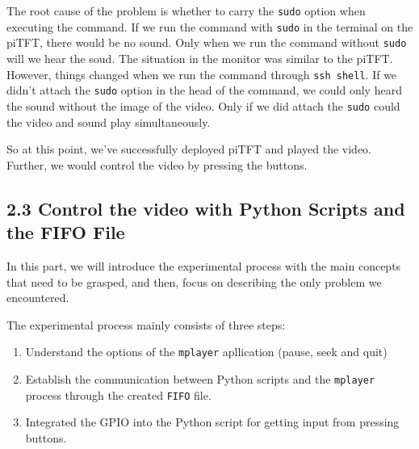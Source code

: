 \documentclass[12pt]{report}
\newcommand{\code}[1]{\colorbox{light-gray}{\texttt{#1}}}
\begin{document}
The root cause of the problem is whether to carry the \code{sudo} option when executing the command. If we run the command with \code{sudo} in the terminal on the piTFT, there would be no sound. Only when we run the command without \code{sudo} will we hear the soud. The situation in the monitor was similar to the piTFT. However, things changed when we run the command through \code{ssh shell}. If we didn't attach the \code{sudo} option in the head of the command, we could only heard the sound without the image of the video. Only if we did attach the \code{sudo} could the video and sound play simultaneously.\par
So at this point, we've successfully deployed piTFT and played the video. Further, we would control the video by pressing the buttons.\par\vspace{-1em}
\subsection*{2.3 \quad Control the video with Python Scripts and the FIFO File\vspace{-1em}}
In this part, we will introduce the experimental process with the main concepts that need to be grasped, and then, focus on describing the only problem we encountered.\par
The experimental process mainly consists of three steps:\vspace{-1em}
\begin{enumerate}
  \item Understand the options of the \code{mplayer} apllication (pause, seek and quit)
  \item Establish the communication between Python scripts and the \code{mplayer} process through the created \code{FIFO} file.
  \item Integrated the GPIO into the Python script for getting input from pressing buttons.
\end{enumerate}\vspace{-1em}
\end{document}

